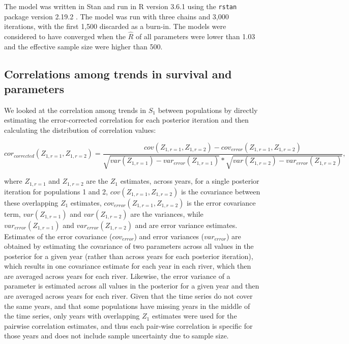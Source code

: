 \documentclass[12pt]{article}
\newcommand{\So}{$S_{1}$\xspace}
\begin{document}
The model was written in Stan \citep{Carpenter2017} and run in R version 3.6.1
\citep{RCoreTeam2019} using the \texttt{rstan} package version 2.19.2
\citep{StanDevelopmentTeam2019}.
The model was run with three chains and 3,000 iterations, with the first 1,500
discarded as a burn-in. The models were considered to have converged when the
$\hat R$ of all parameters were lower than 1.03 and the effective sample size 
were higher than 500.

\subsection*{Correlations among trends in survival and parameters}

We looked at the correlation among trends in \So between populations by
directly estimating the error-corrected correlation for each posterior
iteration and then calculating the distribution of correlation values:

\begin{equation}
cor_{corrected}(Z_{1,r=1},Z_{1,r=2}) = \frac{cov(Z_{1,r=1}, Z_{1,r=2}) - cov_{error}(Z_{1,r=1}, Z_{1,r=2})}
    {\sqrt{var(Z_{1,r=1}) - var_{error}(Z_{1,r=1})}*\sqrt{var(Z_{1,r=2}) - var_{error}(Z_{1,r=2})}}, \label{eq:corz1}
\end{equation}


where $Z_{1,r=1}$ and $Z_{1,r=2}$ are the $Z_1$ estimates, across years, for a
single posterior iteration for populations 1 and 2,
$cov(Z_{1,r=1}, Z_{1,r=2})$ is the covariance between these overlapping $Z_1$ estimates, 
$cov_{error}(Z_{1,r=1}, Z_{1,r=2})$ is the error covariance term,   
$var(Z_{1,r=1})$ and $var(Z_{1,r=2})$ are the variances, while
$var_{error}(Z_{1,r=1})$ and $var_{error}(Z_{1,r=2})$ and are error variance estimates.
Estimates of the error covariance ($cov_{error}$) and error
variances ($var_{error}$) are obtained by estimating the covariance of
two parameters across all values in the posterior for a given year (rather
than across years for each posterior iteration), which results in one
covariance estimate for each year in each river, which then are averaged
across years for each river. Likewise, the error variance of a parameter is estimated  
across all values in the posterior for a given year and then are averaged
across years for each river.
Given that the time series do not cover the same years, and that some populations
have missing years in the middle of the time series, only years with overlapping
$Z_1$ estimates were used for the pairwise correlation estimates, and thus
each pair-wise correlation is specific for those years and does not include sample uncertainty due to sample size.
\end{document}
